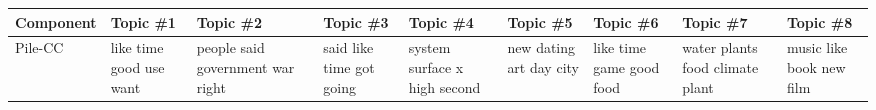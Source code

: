 \documentclass[11pt,a4paper]{article}
\begin{document}
\begin{appendices}
\begin{table*}[htp]
\centering
\vspace{-1.5cm}
\begin{tiny}
\begin{tabular}{|p{}|p{}|p{}|p{}|p{}|p{}|p{}|p{}|p{}|}
\hline
Component & Topic \#1 & Topic \#2 & Topic \#3 & Topic \#4 & Topic \#5 & Topic \#6 & Topic \#7 & Topic \#8\\\hline
Pile-CC & like \newline time \newline good \newline use \newline want & people \newline said \newline government \newline war \newline right & said \newline like \newline time \newline got \newline going & system \newline surface \newline x \newline high \newline second & new \newline dating \newline art \newline day \newline city & like \newline time \newline game \newline good \newline food & water \newline plants \newline food \newline climate \newline plant & music \newline like \newline book \newline new \newline film\\\hline

\end{tabular}
\end{tiny}
\end{table*}
\end{appendices}
\end{document}
